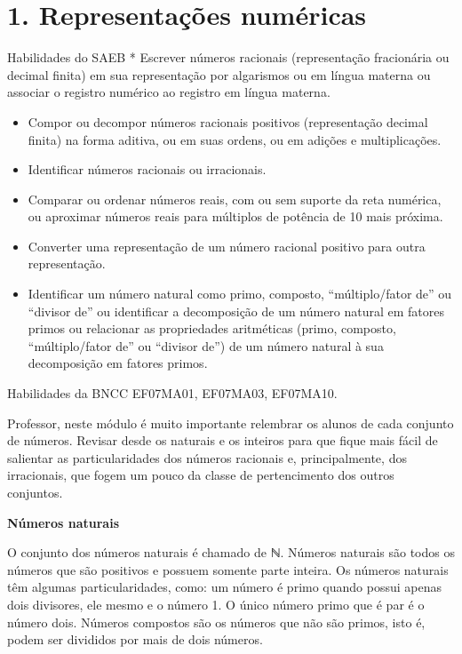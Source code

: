 \hypertarget{representauxe7uxf5es-numuxe9ricas}{%
\section{1. Representações
numéricas}\label{representauxe7uxf5es-numuxe9ricas}}

Habilidades do SAEB * Escrever números racionais (representação
fracionária ou decimal finita) em sua representação por algarismos ou em
língua materna ou associar o registro numérico ao registro em língua
materna.

\begin{itemize}
\item
  Compor ou decompor números racionais positivos (representação decimal
  finita) na forma aditiva, ou em suas ordens, ou em adições e
  multiplicações.
\item
  Identificar números racionais ou irracionais.
\item
  Comparar ou ordenar números reais, com ou sem suporte da reta
  numérica, ou aproximar números reais para múltiplos de potência de 10
  mais próxima.
\item
  Converter uma representação de um número racional positivo para outra
  representação.
\item
  Identificar um número natural como primo, composto, ``múltiplo/fator
  de'' ou ``divisor de'' ou identificar a decomposição de um número
  natural em fatores primos ou relacionar as propriedades aritméticas
  (primo, composto, ``múltiplo/fator de'' ou ``divisor de'') de um
  número natural à sua decomposição em fatores primos.
\end{itemize}

Habilidades da BNCC EF07MA01, EF07MA03, EF07MA10.

Professor, neste módulo é muito importante relembrar os alunos de cada
conjunto de números. Revisar desde os naturais e os inteiros para que
fique mais fácil de salientar as particularidades dos números racionais
e, principalmente, dos irracionais, que fogem um pouco da classe de
pertencimento dos outros conjuntos.~

\textbf{Números naturais}

O conjunto dos números naturais é chamado de ℕ. Números naturais são
todos os números que são positivos e possuem somente parte inteira. Os
números naturais têm algumas particularidades, como: um número é primo
quando possui apenas dois divisores, ele mesmo e o número 1. O único
número primo que é par é o número dois. Números compostos são os números
que não são primos, isto é, podem ser divididos por mais de dois
números.~

